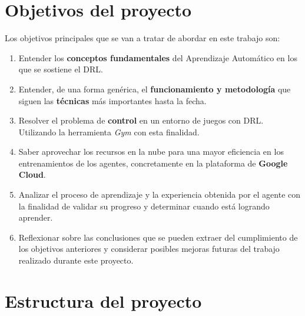 \documentclass[11pt,fleqn]{book} %
\begin{document}
\section{Objetivos del proyecto}\label{sec:objetivos}

Los objetivos principales que se van a tratar de abordar en este trabajo son: \\

\begin{enumerate}
	\item Entender los \textbf{conceptos fundamentales} del Aprendizaje Automático en los que se sostiene el DRL. \\
	
	\item Entender, de una forma genérica, el \textbf{funcionamiento y metodología} que siguen las \textbf{técnicas} más importantes hasta la fecha. \\
	
	\item Resolver el problema de \textbf{control} en un entorno de juegos con DRL. Utilizando la herramienta \textit{Gym} con esta finalidad. \cite{article:gym} \\
	
	\item Saber aprovechar los recursos en la nube para una mayor eficiencia en los entrenamientos de los agentes, concretamente en la plataforma de \textbf{Google Cloud}. \\
	
	\item Analizar el proceso de aprendizaje y la experiencia obtenida por el agente con la finalidad de validar su progreso y determinar cuando está logrando aprender. \\
	
	
	\item Reflexionar sobre las conclusiones que se pueden extraer del cumplimiento de los objetivos anteriores y considerar posibles mejoras futuras del trabajo realizado durante este proyecto.
\end{enumerate}

\section{Estructura del proyecto}\label{sec:planificacion}
\end{document}
